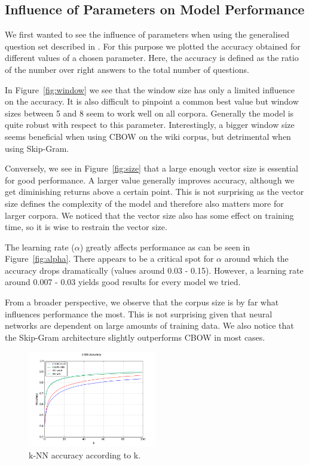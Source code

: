 \documentclass[conference]{IEEEtran}
\begin{document}
\subsection{Influence of Parameters on Model Performance}
We first wanted to see the influence of parameters when using the generalised question set described in \cite{mikolov2013efficient}.
For this purpose we plotted the accuracy obtained for different values of a chosen parameter.
Here, the accuracy is defined as the ratio of the number over right answers to the total number of questions.

In Figure~\ref{fig:window} we see that the window size has only a limited influence on the accuracy.
It is also difficult to pinpoint a common best value but window sizes between 5 and 8 seem to work well on all corpora. 
Generally the model is quite robust with respect to this parameter.
Interestingly, a bigger window size seems beneficial when using CBOW on the wiki corpus, but detrimental when using Skip-Gram.

Conversely, we see in Figure~\ref{fig:size} that a large enough vector size is essential for good performance.
A larger value generally improves accuracy, although we get diminishing returns above a certain point.
This is not surprising as the vector size defines the complexity of the model and therefore also matters more for larger corpora.
We noticed that the vector size also has some effect on training time, so it is wise to restrain the vector size.

The learning rate ($\alpha$) greatly affects performance as can be seen in Figure~\ref{fig:alpha}.
There appears to be a critical spot for $\alpha$ around which the accuracy drops dramatically (values around 0.03 - 0.15). 
However, a learning rate around 0.007 - 0.03 yields good results for every model we tried.

From a broader perspective, we observe that the corpus size is by far what influences performance the most. This is not surprising given 
that neural networks are dependent on large amounts of training data. 
We also notice that the Skip-Gram architecture  slightly outperforms CBOW in most cases.


\begin{figure}[t]
\centering
\includegraphics[width=0.5\textwidth]{graph_knn-acc}
\caption{k-NN accuracy according to k.}
\label{fig:knn}
\end{figure}
\end{document}
